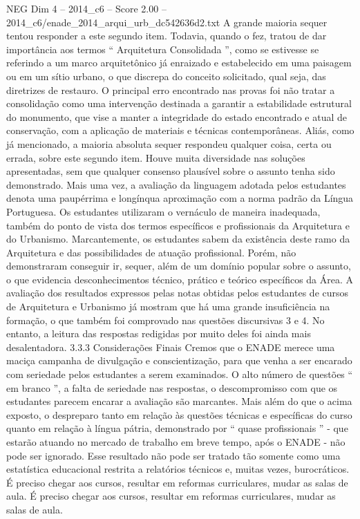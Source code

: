 \begin{textsample}{NEG Dim 4 – 2014\_c6 – Score 2.00 – 2014\_c6/enade\_2014\_arqui\_urb\_dc542636d2.txt}
A grande maioria sequer tentou responder a este segundo item.
Todavia, quando o fez, tratou de dar importância aos termos “ Arquitetura Consolidada ”, como se estivesse se referindo a um marco arquitetônico já enraizado e estabelecido em uma paisagem ou em um sítio urbano, o que discrepa do conceito solicitado, qual seja, das diretrizes de restauro.
O principal erro encontrado nas provas foi não tratar a consolidação como uma intervenção destinada a garantir a estabilidade estrutural do monumento, que vise a manter a integridade do estado encontrado e atual de conservação, com a aplicação de materiais e técnicas contemporâneas.
Aliás, como já mencionado, a maioria absoluta sequer respondeu qualquer coisa, certa ou errada, sobre este segundo item.
Houve muita diversidade nas soluções apresentadas, sem que qualquer consenso plausível sobre o assunto tenha sido demonstrado.
Mais uma vez, a avaliação da linguagem adotada pelos estudantes denota uma paupérrima e longínqua aproximação com a norma padrão da Língua Portuguesa.
Os estudantes utilizaram o vernáculo de maneira inadequada, também do ponto de vista dos termos específicos e profissionais da Arquitetura e do Urbanismo.
Marcantemente, os estudantes sabem da existência deste ramo da Arquitetura e das possibilidades de atuação profissional.
Porém, não demonstraram conseguir ir, sequer, além de um domínio popular sobre o assunto, o que evidencia desconhecimentos técnico, prático e teórico específicos da Área.
A avaliação dos resultados expressos pelas notas obtidas pelos estudantes de cursos de Arquitetura e Urbanismo já mostram que há uma grande insuficiência na formação, o que também foi comprovado nas questões discursivas 3 e 4.
No entanto, a leitura das respostas redigidas por muito deles foi ainda mais desalentadora. 3.3.3 Considerações Finais Cremos que o ENADE merece uma maciça campanha de divulgação e conscientização, para que venha a ser encarado com seriedade pelos estudantes a serem examinados.
O alto número de questões “ em branco ”, a falta de seriedade nas respostas, o descompromisso com que os estudantes parecem encarar a avaliação são marcantes.
Mais além do que o acima exposto, o despreparo tanto em relação às questões técnicas e específicas do curso quanto em relação à língua pátria, demonstrado por “ quase profissionais ” - que estarão atuando no mercado de trabalho em breve tempo, após o ENADE - não pode ser ignorado.
Esse resultado não pode ser tratado tão somente como uma estatística educacional restrita a relatórios técnicos e, muitas vezes, burocráticos.
É preciso chegar aos cursos, resultar em reformas curriculares, mudar as salas de aula.
É preciso chegar aos cursos, resultar em reformas curriculares, mudar as salas de aula.

\end{textsample}
